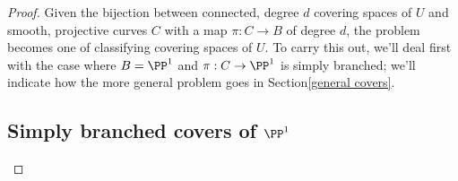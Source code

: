 \begin{proof}
%   
%   
   
   Given the bijection between connected, degree $d$ covering spaces of $U$ and smooth, projective curves $C$ with a map $\pi : C \to B$ of degree $d$, the problem becomes one of classifying covering spaces of $U$. To carry this out, we'll deal first with the case where  $B = \PP^1$ and $\pi : C \to \PP^1$ is simply branched; we'll indicate how the more general problem goes in Section\ref{general covers}.
   
 \subsection{Simply branched covers of $\PP^1$} 
 

\end{proof}

